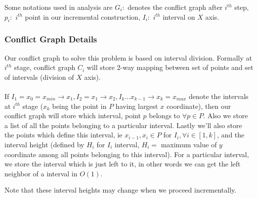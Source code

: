 \documentclass[a4paper]{article}
\begin{document}
Some notations used in analysis are $G_i: $ denotes the conflict graph after $i^{th}$ step, $p_i: $ $i^{th}$ point in our incremental construction, $I_i: $ $i^{th}$ interval on $X$ axis.

\subsubsection*{Conflict Graph Details}
Our conflict graph to solve this problem is based on interval division. Formally at $i^{th}$ stage, conflict graph $C_i$ will store 2-way mapping between set of points and set of intervals (division of $X$ axis). \\ \\ 
If $I_1 = x_0 = x_{min}\rightarrow x_1, I_2 = x_1 \rightarrow x_2, I_k \ldots x_{k-1} \rightarrow x_{k} = x_{max}$ denote the intervals at $i^{th}$ stage ($x_k$ being the point in $P$ having largest $x$ coordinate), then our conflict graph will store which interval, point $p$ belongs to $\forall p \in P$. Also we store a list of all the points belonging to a particular interval. Lastly we'll also store the points which define this interval, ie $x_{i-1}, x_i\in P$ for $I_i, \forall i \in [1,k]$, and the interval height (defined by $H_{i}$ for $I_i$ interval, $H_i =$ maximum value of $y$ coordinate among all points belonging to this interval). For a particular interval, we store the interval which is just left to it, in other words we can get the left neighbor of a interval in $O(1)$. 

Note that these interval heights may change when we proceed incrementally.\\ \\
\end{document}
